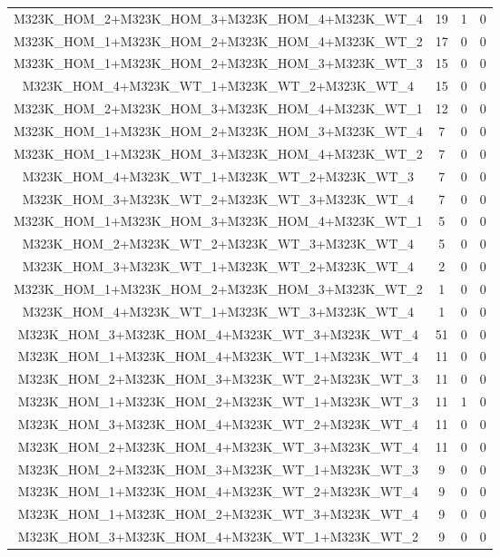 \begin{appendices}
\begin{table}[!htbp]
\begin{tabular}{@{\extracolsep{5pt}} cccc}
		M323K\_HOM\_2+M323K\_HOM\_3+M323K\_HOM\_4+M323K\_WT\_4 & 19 & 1 & 0 \\ 
		M323K\_HOM\_1+M323K\_HOM\_2+M323K\_HOM\_4+M323K\_WT\_2 & 17 & 0 & 0 \\ 
		M323K\_HOM\_1+M323K\_HOM\_2+M323K\_HOM\_3+M323K\_WT\_3 & 15 & 0 & 0 \\ 
		M323K\_HOM\_4+M323K\_WT\_1+M323K\_WT\_2+M323K\_WT\_4 & 15 & 0 & 0 \\ 
		M323K\_HOM\_2+M323K\_HOM\_3+M323K\_HOM\_4+M323K\_WT\_1 & 12 & 0 & 0 \\ 
		M323K\_HOM\_1+M323K\_HOM\_2+M323K\_HOM\_3+M323K\_WT\_4 & 7 & 0 & 0 \\ 
		M323K\_HOM\_1+M323K\_HOM\_3+M323K\_HOM\_4+M323K\_WT\_2 & 7 & 0 & 0 \\ 
		M323K\_HOM\_4+M323K\_WT\_1+M323K\_WT\_2+M323K\_WT\_3 & 7 & 0 & 0 \\ 
		M323K\_HOM\_3+M323K\_WT\_2+M323K\_WT\_3+M323K\_WT\_4 & 7 & 0 & 0 \\ 
		M323K\_HOM\_1+M323K\_HOM\_3+M323K\_HOM\_4+M323K\_WT\_1 & 5 & 0 & 0 \\ 
		M323K\_HOM\_2+M323K\_WT\_2+M323K\_WT\_3+M323K\_WT\_4 & 5 & 0 & 0 \\ 
		M323K\_HOM\_3+M323K\_WT\_1+M323K\_WT\_2+M323K\_WT\_4 & 2 & 0 & 0 \\ 
		M323K\_HOM\_1+M323K\_HOM\_2+M323K\_HOM\_3+M323K\_WT\_2 & 1 & 0 & 0 \\ 
		M323K\_HOM\_4+M323K\_WT\_1+M323K\_WT\_3+M323K\_WT\_4 & 1 & 0 & 0 \\ 
		M323K\_HOM\_3+M323K\_HOM\_4+M323K\_WT\_3+M323K\_WT\_4 & 51 & 0 & 0 \\ 
		M323K\_HOM\_1+M323K\_HOM\_4+M323K\_WT\_1+M323K\_WT\_4 & 11 & 0 & 0 \\ 
		M323K\_HOM\_2+M323K\_HOM\_3+M323K\_WT\_2+M323K\_WT\_3 & 11 & 0 & 0 \\ 
		M323K\_HOM\_1+M323K\_HOM\_2+M323K\_WT\_1+M323K\_WT\_3 & 11 & 1 & 0 \\ 
		M323K\_HOM\_3+M323K\_HOM\_4+M323K\_WT\_2+M323K\_WT\_4 & 11 & 0 & 0 \\ 
		M323K\_HOM\_2+M323K\_HOM\_4+M323K\_WT\_3+M323K\_WT\_4 & 11 & 0 & 0 \\ 
		M323K\_HOM\_2+M323K\_HOM\_3+M323K\_WT\_1+M323K\_WT\_3 & 9 & 0 & 0 \\ 
		M323K\_HOM\_1+M323K\_HOM\_4+M323K\_WT\_2+M323K\_WT\_4 & 9 & 0 & 0 \\ 
		M323K\_HOM\_1+M323K\_HOM\_2+M323K\_WT\_3+M323K\_WT\_4 & 9 & 0 & 0 \\ 
		M323K\_HOM\_3+M323K\_HOM\_4+M323K\_WT\_1+M323K\_WT\_2 & 9 & 0 & 0 \\ 

\end{tabular}
\end{table}
\end{appendices}
